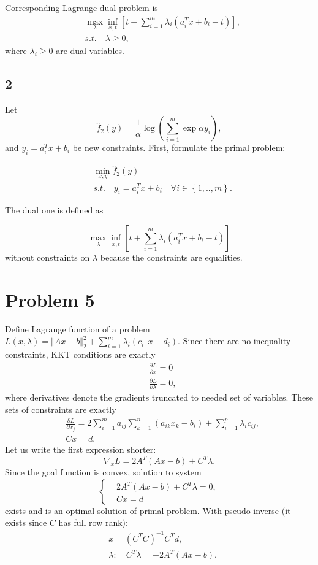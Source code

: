 \documentclass[a4paper,12pt,russian]{extreport}
\begin{document}
Corresponding Lagrange dual problem is
\begin{align*}
&\max_{\lambda} \inf_{x,t} \left[t+ \sum_{i=1}^{m} \lambda_i(a_{i}^Tx + b_i - t)\right],\\
& s.t. \quad \lambda \geq 0,
\end{align*}
where $\lambda_i \geq 0$ are dual variables.

\subsection*{2}

Let 
$$
\hat{f}_2(y)=\frac{1}{\alpha}\log{\left( \sum_{i=1}^m \exp{\alpha y_i}\right)},
$$
and $y_i=a_i^Tx+b_i$ be new constraints. First, formulate the primal problem:

\begin{align*}
& \min_{x,y} \hat{f}_2(y)\\
&s.t. \quad y_i=a_i^Tx+b_i \quad \forall i \in \left\lbrace 1,..,m \right\rbrace.
\end{align*}

The dual one is defined as

$$
\max_{\lambda} \inf_{x,t} \left[t+ \sum_{i=1}^{m} \lambda_i(a_{i}^Tx + b_i - t)\right]
$$
without constraints on $\lambda$ because the constraints are equalities.

\section* {Problem 5}

Define Lagrange function of a problem $L(x,\lambda)=\Vert Ax-b\Vert_2^2+\sum_{i=1}^m\lambda_i(c_{i\cdot}x-d_i)$. Since there are no inequality constraints, KKT conditions are exactly
\begin{align*}
&\frac{\partial L}{\partial x} =0\\
&\frac{\partial L}{\partial \lambda} =0,
\end{align*}
where derivatives denote the gradients truncated to needed set of variables. These sets of constraints are exactly
\begin{align*}
&\frac{\partial L}{\partial x_j} = 2\sum_{i=1}^m a_{ij}\sum_{k=1}^n(a_{ik}x_k - b_i)+ \sum_{i=1}^p\lambda_i c_{ij}, \\
&Cx=d.
\end{align*}
Let us write the first expression shorter:
$$
\nabla_{x}L = 2A^T(Ax-b) +  C^T\lambda.
$$
Since the goal function is convex, solution to system
$$
\begin{cases}
&2A^T(Ax-b)+C^T\lambda=0,\\
&Cx=d
\end{cases}
$$
exists and is an optimal solution of primal problem. With pseudo-inverse (it exists since $C$ has full row rank):
\begin{align*}
& x=(C^TC)^{-1}C^Td,\\
& \lambda: \quad C^T\lambda = -2A^T(Ax-b).
\end{align*}
\end{document}
